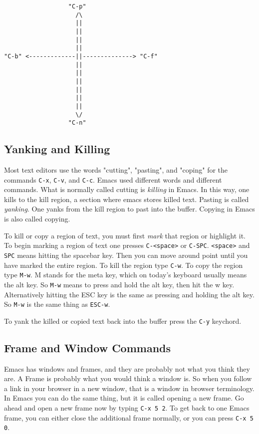 \documentclass[11pt]{article}
\begin{document}
\begin{verbatim}
                  "C-p"
                    /\
                    ||
                    ||
                    ||
                    ||
"C-b" <-------------||--------------> "C-f"
                    ||
                    ||
                    ||
                    ||
                    ||
                    ||
                    \/
                  "C-n"
\end{verbatim}

\subsection{Yanking and Killing}
\label{sec:orgheadline5}
Most text editors use the words "cutting", "pasting", and "coping" for the commands \texttt{C-x}, \texttt{C-v}, and \texttt{C-c}.  Emacs used different words and different commands.  What is normally called cutting is \emph{killing} in Emacs.  In this way, one kills to the kill region, a section where emacs stores killed text.  Pasting is called \emph{yanking}.  One yanks from the kill region to past into the buffer.  Copying in Emacs is also called copying.

To kill or copy a region of text, you must first \emph{mark} that region or highlight it.  To begin marking a region of text one presses \texttt{C-<space>} or \texttt{C-SPC}.  \texttt{<space>} and \texttt{SPC} means hitting the spacebar key.    Then you can move around point until you have marked the entire region.  To kill the region type \texttt{C-w}.  To copy the region type \texttt{M-w}.  M stands for the meta key, which on today's keyboard usually means the alt key.  So \texttt{M-w} means to press and hold the alt key, then hit the w key.  Alternatively hitting the ESC key is the same as pressing and holding the alt key.  So \texttt{M-w} is the same thing as \texttt{ESC-w}.

To yank the killed or copied text back into the buffer press the \texttt{C-y} keychord.

\subsection{Frame and Window Commands}
\label{sec:orgheadline2}
Emacs has windows and frames, and they are probably not what you think they are.  A Frame is probably what you would think a window is.  So when you follow a link in your browser in a new window, that is a window in browser terminology.  In Emacs you can do the same thing, but it is called opening a new frame.  Go ahead and open a new frame now by typing \texttt{C-x 5 2}.  To get back to one Emacs frame, you can either close the additional frame normally, or you can press \texttt{C-x 5 0}.
\end{document}
